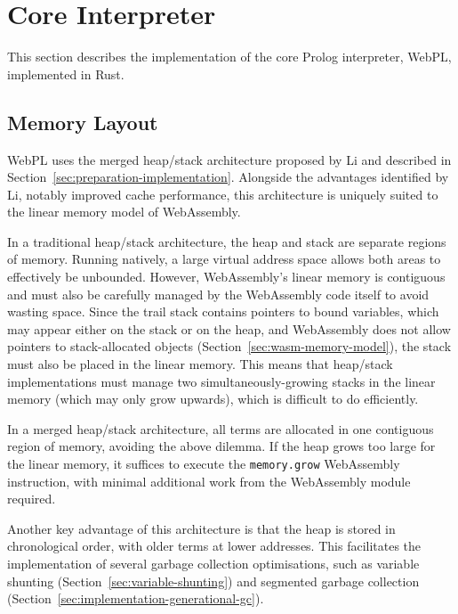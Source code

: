 \section{Core Interpreter}

\label{sec:core-interpreter}

This section describes the implementation of the core Prolog interpreter, WebPL, implemented in Rust.

\subsection{Memory Layout}

\label{sec:memory-layout}

WebPL uses the merged heap/stack architecture proposed by Li \cite{liEfficientMemoryManagement2000} and described in Section~\ref{sec:preparation-implementation}. Alongside the advantages identified by Li, notably improved cache performance, this architecture is uniquely suited to the linear memory model of WebAssembly.

In a traditional heap/stack architecture, the heap and stack are separate regions of memory. Running natively, a large virtual address space allows both areas to effectively be unbounded. However, WebAssembly's linear memory is contiguous and must also be carefully managed by the WebAssembly code itself to avoid wasting space. Since the trail stack contains pointers to bound variables, which may appear either on the stack or on the heap, and WebAssembly does not allow pointers to stack-allocated objects (Section~\ref{sec:wasm-memory-model}), the stack must also be placed in the linear memory. This means that heap/stack implementations must manage two simultaneously-growing stacks in the linear memory (which may only grow upwards), which is difficult to do efficiently.

In a merged heap/stack architecture, all terms are allocated in one contiguous region of memory, avoiding the above dilemma. If the heap grows too large for the linear memory, it suffices to execute the \texttt{memory.grow} WebAssembly instruction, with minimal additional work from the WebAssembly module required.

Another key advantage of this architecture is that the heap is stored in chronological order, with older terms at lower addresses. This facilitates the implementation of several garbage collection optimisations, such as variable shunting (Section~\ref{sec:variable-shunting}) and segmented garbage collection (Section~\ref{sec:implementation-generational-gc}).

